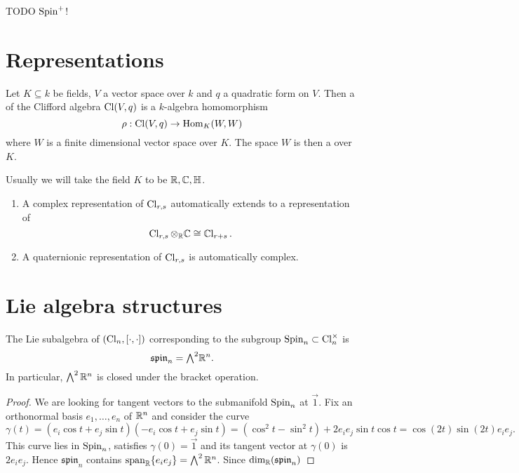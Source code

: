TODO $\operatorname{Spin}^+$!

\section{Representations}

\begin{definition}
Let $K \subseteq k$ be fields, $V$ a vector space over $k$ and $q$ a quadratic form on $V$. Then a  of the Clifford algebra $\operatorname{Cl}(V,q)$ is a $k$-algebra homomorphism
\[ \rho: \operatorname{Cl}(V,q) \to \operatorname{Hom}_K(W,W) \]
where $W$ is a finite dimensional vector space over $K$. The space $W$ is then a  over $K$.
\end{definition}

Usually we will take the field $K$ to be $\mathbb{R},\mathbb{C},\mathbb{H}$.

\begin{lemma}
\begin{enumerate}
\item A complex representation of $\operatorname{Cl}_{r,s}$ automatically extends to a representation of
\[ \operatorname{Cl}_{r,s}\otimes_{\mathbb{R}} \mathbb{C} \cong \operatorname{\mathbb{C}l}_{r+s}. \]
\item A quaternionic representation of $\operatorname{Cl}_{r,s}$ is automatically complex.
\end{enumerate}
\end{lemma}

\section{Lie algebra structures}

\begin{proposition}
The Lie subalgebra of $(\operatorname{Cl}_n, [\cdot,\cdot])$ corresponding to the subgroup $\operatorname{Spin}_n\subset \operatorname{Cl}_n^\times$ is
\[ \mathfrak{spin}_n = {\textstyle \bigwedge^2}\mathbb{R}^n. \]
In particular, $\bigwedge^2\mathbb{R}^n$ is closed under the bracket operation.
\end{proposition}
\begin{proof}
We are looking for tangent vectors to the submanifold $\operatorname{Spin}_n$ at $\vec{1}$. Fix an orthonormal basis $e_1,\ldots, e_n$ of $\mathbb{R}^n$ and consider the curve
\[ \gamma(t) = (e_i\cos t+ e_j\sin t)(-e_i\cos t+ e_j\sin t) = (\cos^2 t - \sin^2 t)+2e_ie_j\sin t\cos t = \cos(2t)\sin(2t)e_ie_j. \]
This curve lies in $\operatorname{Spin}_n$, satisfies $\gamma(0) = \vec{1}$ and its tangent vector at $\gamma(0)$ is $2e_ie_j$. Hence $\mathfrak{spin}_n$ contains $\operatorname{span}_{\mathbb{R}}\{e_ie_j\} = \bigwedge^2\mathbb{R}^n$. Since $\dim_{\mathbb{R}}(\mathfrak{spin}_n)$
\end{proof}






